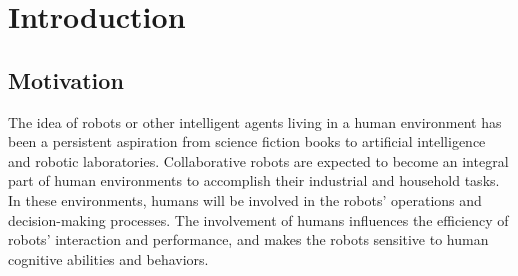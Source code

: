 \documentclass[12pt]{report}
\begin{document}
\pagebreak

\tableofcontents
\pagebreak

\listoffigures
\pagebreak

\listoftables
\pagebreak

\listofalgorithms
{}
\pagebreak


\chapter{Introduction}
\label{ch:introduction}

\section{Motivation}

The idea of robots or other intelligent agents living in a human environment has
been a persistent aspiration from science fiction books to artificial
intelligence and robotic laboratories. Collaborative robots are expected to
become an integral part of human environments to accomplish their industrial
and household tasks. In these environments, humans will be involved in
the robots' operations and decision-making processes. The involvement of humans
influences the efficiency of robots' interaction and performance, and makes the
robots sensitive to human cognitive abilities and behaviors.
\end{document}
